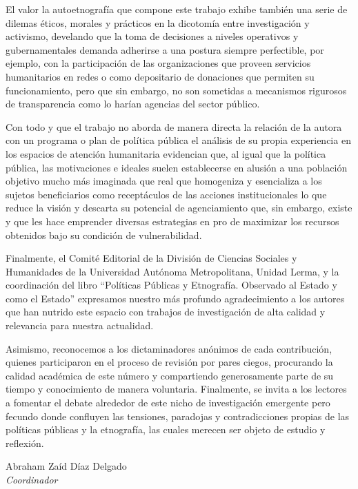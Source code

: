 \documentclass[
  spanish,
  11pt,
  a4paper,
]{scrbook}
\begin{document}
El valor la autoetnografía que compone este trabajo exhibe también una
serie de dilemas éticos, morales y prácticos en la dicotomía entre
investigación y activismo, develando que la toma de decisiones a niveles
operativos y gubernamentales demanda adherirse a una postura siempre
perfectible, por ejemplo, con la participación de las organizaciones que
proveen servicios humanitarios en redes o como depositario de donaciones
que permiten su funcionamiento, pero que sin embargo, no son sometidas a
mecanismos rigurosos de transparencia como lo harían agencias del sector
público.

Con todo y que el trabajo no aborda de manera directa la relación de la
autora con un programa o plan de política pública el análisis de su
propia experiencia en los espacios de atención humanitaria evidencian
que, al igual que la política pública, las motivaciones e ideales suelen
establecerse en alusión a una población objetivo mucho más imaginada que
real que homogeniza y esencializa a los sujetos beneficiarios como
receptáculos de las acciones institucionales lo que reduce la visión y
descarta su potencial de agenciamiento que, sin embargo, existe y que
les hace emprender diversas estrategias en pro de maximizar los recursos
obtenidos bajo su condición de vulnerabilidad.

\vspace*{1cm}

Finalmente, el Comité Editorial de la División de Ciencias Sociales y
Humanidades de la Universidad Autónoma Metropolitana, Unidad Lerma, y la
coordinación del libro ``Políticas Públicas y Etnografía. Observado al
Estado y como el Estado'' expresamos nuestro más profundo agradecimiento
a los autores que han nutrido este espacio con trabajos de investigación
de alta calidad y relevancia para nuestra actualidad.

Asimismo, reconocemos a los dictaminadores anónimos de cada
contribución, quienes participaron en el proceso de revisión por pares
ciegos, procurando la calidad académica de este número y compartiendo
generosamente parte de su tiempo y conocimiento de manera voluntaria.
Finalmente, se invita a los lectores a fomentar el debate alrededor de
este nicho de investigación emergente pero fecundo donde confluyen las
tensiones, paradojas y contradicciones propias de las políticas públicas
y la etnografía, las cuales merecen ser objeto de estudio y reflexión.

\begin{flushright}
\Large Abraham Zaíd Díaz Delgado\\

\Large \textit{Coordinador}
\end{flushright}
\end{document}
